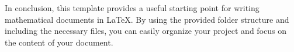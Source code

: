 In conclusion, this template provides a useful starting point for writing mathematical documents in \LaTeX. By using the provided folder structure and including the necessary files, you can easily organize your project and focus on the content of your document.

